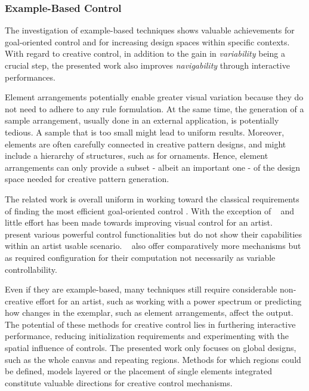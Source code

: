 
\subsubsection{Example-Based Control}
\label{subsubsec:analysis_creative_means_example}

The investigation of example-based techniques shows valuable achievements for goal-oriented control and for increasing design spaces within specific contexts. With regard to creative control, in addition to the gain in \textit{variability} being a crucial step, the presented work also improves \textit{navigability} through interactive performances.

Element arrangements potentially enable greater visual variation because they do not need to adhere to any rule formulation. At the same time, the generation of a sample arrangement, usually done in an external application, is potentially tedious. A sample that is too small might lead to uniform results. Moreover, elements are often carefully connected in creative pattern designs, and might include a hierarchy of structures, such as for ornaments. Hence, element arrangements can only provide a subset - albeit an important one - of the design space needed for creative pattern generation.

The related work is overall uniform in working toward the classical requirements of finding the most efficient goal-oriented control 
. With the exception of \citeauthor*{ijiri_2008_aeb}~\cite{ijiri_2008_aeb} and \citeauthor*{galerne_2012_gne}~\cite{galerne_2012_gne} little effort has been made towards improving visual control for an artist. \citeauthor*{ma_2013_det}~\cite{ma_2013_det} present various powerful control functionalities but do not show their capabilities within an artist usable scenario. \citeauthor*{gilet_2012_map}~\cite{gilet_2012_map} also offer comparatively more mechanisms but as required configuration for their computation not necessarily as variable controllability.

Even if they are example-based, many techniques still require considerable non-creative effort for an artist, such as working with a power spectrum or predicting how changes in the exemplar, such as element arrangements, affect the output. The potential of these methods for creative control lies in furthering interactive performance, reducing initialization requirements and experimenting with the spatial influence of controls. The presented work only focuses on global designs, such as the whole canvas and repeating regions. Methods for which regions could be defined, models layered or the placement of single elements integrated constitute valuable directions for creative control mechanisms.


